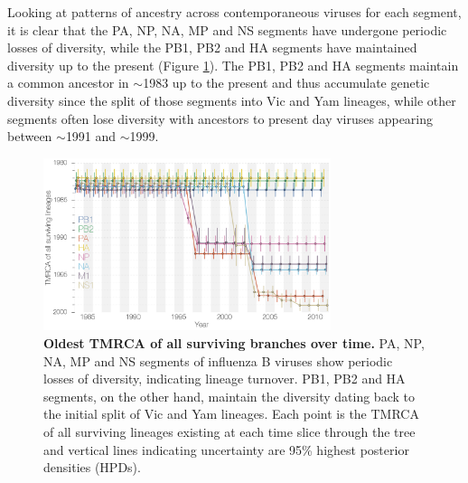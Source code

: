 \documentclass[11pt,oneside,letterpaper]{article}
\begin{document}
Looking at patterns of ancestry across contemporaneous viruses for each segment, it is clear that the PA, NP, NA, MP and NS segments have undergone periodic losses of diversity, while the PB1, PB2 and HA segments have maintained diversity up to the present (Figure \ref{tmrcaOT}).
The PB1, PB2 and HA segments maintain a common ancestor in $\sim$1983 up to the present and thus accumulate genetic diversity since the split of those segments into Vic and Yam lineages, while other segments often lose diversity with ancestors to present day viruses appearing between $\sim$1991 and $\sim$1999.

\begin{figure}[h]
	\centering		
	\includegraphics[width=0.75\textwidth]{figures/InfB_tmrcaOT_lines.png}
	\caption{\textbf{Oldest TMRCA of all surviving branches over time.}
PA, NP, NA, MP and NS segments of influenza B viruses show periodic losses of diversity, indicating lineage turnover.
PB1, PB2 and HA segments, on the other hand, maintain the diversity dating back to the initial split of Vic and Yam lineages.
Each point is the TMRCA of all surviving lineages existing at each time slice through the tree and vertical lines indicating uncertainty are 95\% highest posterior densities (HPDs).}
	\label{tmrcaOT}
\end{figure}
\end{document}
